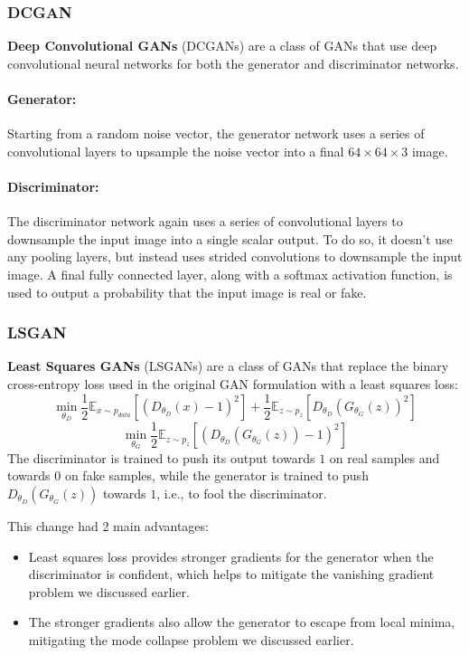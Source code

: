 \subsubsection{DCGAN}
\textbf{Deep Convolutional GANs} (DCGANs) are a class of GANs that use deep convolutional neural networks for both the generator and discriminator networks.

\paragraph{Generator:} Starting from a random noise vector, the generator network uses a series of convolutional layers to upsample the noise vector into a
final $64 \times 64 \times 3$ image.

\paragraph{Discriminator:} The discriminator network again uses a series of convolutional layers  to downsample the input image into a single scalar output.
To do so, it doesn't use any pooling layers, but instead uses strided convolutions to downsample the input image.
A final fully connected layer, along with a softmax activation function, is used to output a probability that the input image is real or fake.

\subsubsection{LSGAN}
\textbf{Least Squares GANs} (LSGANs) are a class of GANs that replace the binary cross-entropy loss used in the original GAN formulation with a least squares loss:
\begin{equation}
    \min_{\theta_D} \frac{1}{2}\mathbb{E}_{x \sim p_{data}}[(D_{\theta_D}(x) - 1)^2] + \frac{1}{2}\mathbb{E}_{z \sim p_{z}}[D_{\theta_D}(G_{\theta_G}(z))^2]
\end{equation}
\begin{equation}
    \min_{\theta_G} \frac{1}{2}\mathbb{E}_{z \sim p_{z}}[(D_{\theta_D}(G_{\theta_G}(z)) - 1)^2]
\end{equation}
The discriminator is trained to push its output towards $1$ on real samples and towards $0$ on fake samples, while the generator is trained to push $D_{\theta_D}(G_{\theta_G}(z))$ towards $1$, i.e., to fool the discriminator.

This change had 2 main advantages:
\begin{itemize}
    \item Least squares loss provides stronger gradients for the generator when the discriminator is confident, which helps to mitigate the vanishing gradient problem
    we discussed earlier.
    \item The stronger gradients also allow the generator to escape from local minima, mitigating the mode collapse problem we discussed earlier.
\end{itemize}

